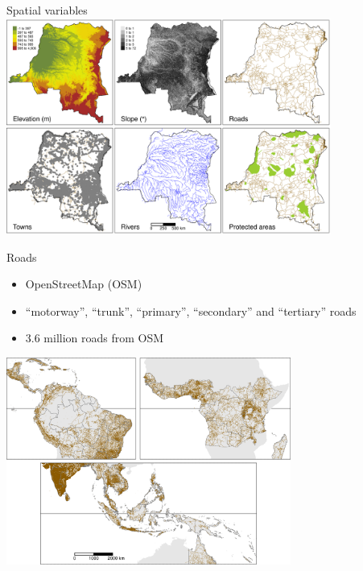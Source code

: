 \documentclass[10pt,table,dvipsnames,compress]{beamer}
\begin{document}
\begin{frame}[label={sec:org4ddf9e6}]{Spatial variables}
\centering \includegraphics[width=0.8\textwidth]{figs/sm/var}

\end{frame}

\begin{frame}[label={sec:org854e294}]{Roads}
\begin{itemize}
\item OpenStreetMap (OSM)
\item ``motorway'', ``trunk'', ``primary'', ``secondary'' and ``tertiary'' roads
\item 3.6 million roads from OSM
\end{itemize}

\centering \includegraphics[width=0.7\textwidth]{figs/sm/roads}
\end{frame}
\end{document}
